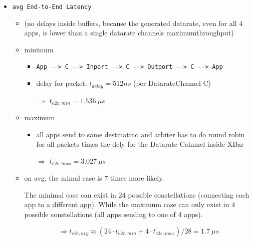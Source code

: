 \documentclass[]{scrartcl}
\begin{document}
\begin{itemize}
        \item \verb|avg End-to-End Latency|
            \begin{itemize}
                \item (no delays inside buffers, because the generated datarate, even for all 4 apps, is lower than a single datarate channels maximumthroughput)
                \item minimum
                    \begin{itemize}
                        \item \verb|App --> C --> Inport --> C --> Outport --> C --> App|
                        \item delay for packet: $t_{delay}=512ns$ (per DatarateChannel C)
                        \item[$\Rightarrow$] $t_{e2e,min} = \SI{1.536}{\mu s}$
                    \end{itemize}
                \item maximum
                    \begin{itemize}
                        \item all apps send to same destinatino and arbiter has to do round robin for all packets  times the dely for the Datarate Cahnnel inside XBar
                        \item[$\Rightarrow$] $t_{e2e, max} = \SI{3.027}{\mu s}$
                    \end{itemize}
                \item on avg, the mimal case is 7 times more likely.

                    The minimal case can exist in 24 possible constellations (connecting each app to a different app).
                    While the maximum case can only exist in 4 possible constellations (all apps sending to one of 4 apps).

                    \[\Rightarrow t_{e2e, avg} \approx \left( 24\cdot t_{e2e,min} + 4\cdot t_{e2e,max}\right)/28 = \SI{1.7}{\mu s} \]


\end{itemize}
\end{itemize}
\end{document}
